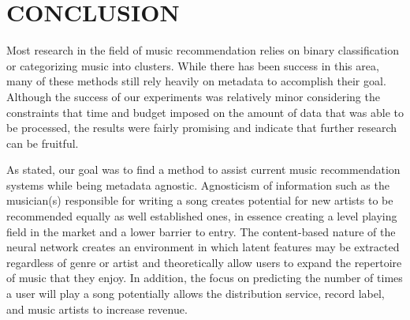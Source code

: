 \section{CONCLUSION}
Most research in the field of music recommendation relies on binary classification or categorizing music into clusters. While there has been success in this area, many of these methods still rely heavily on metadata to accomplish their goal.\cite{Wang2014,Wang:2014:ICH:2647868.2654940} Although the success of our experiments was relatively minor considering the constraints that time and budget imposed on the amount of data that was able to be processed, the results were fairly promising and indicate that further research can be fruitful.

As stated, our goal was to find a method to assist current music recommendation systems while being metadata agnostic. Agnosticism of information such as the musician(s) responsible for writing a song creates potential for new artists to be recommended equally as well established ones, in essence creating a level playing field in the market and a lower barrier to entry. The content-based nature of the neural network creates an environment in which latent features may be extracted regardless of genre or artist and theoretically allow users to expand the repertoire of music that they enjoy. In addition, the focus on predicting the number of times a user will play a song potentially allows the distribution service, record label, and music artists to increase revenue.